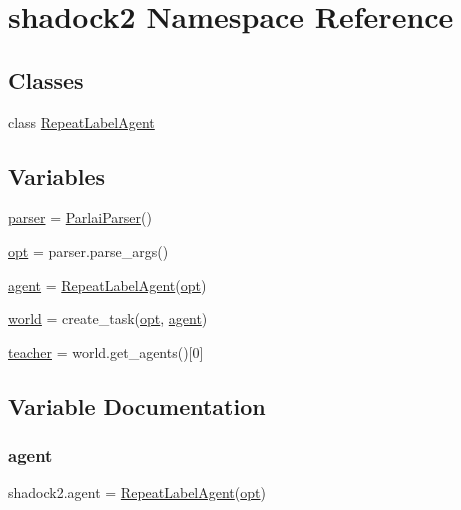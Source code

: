 \hypertarget{namespaceshadock2}{}\section{shadock2 Namespace Reference}
\label{namespaceshadock2}
\subsection*{Classes}
\begin{DoxyCompactItemize}
\item 
class \hyperlink{classshadock2_1_1RepeatLabelAgent}{Repeat\+Label\+Agent}
\end{DoxyCompactItemize}
\subsection*{Variables}
\begin{DoxyCompactItemize}
\item 
\hyperlink{namespaceshadock2_a89dd1b082837e937b1dacacec493a269}{parser} = \hyperlink{classparlai_1_1core_1_1params_1_1ParlaiParser}{Parlai\+Parser}()
\item 
\hyperlink{namespaceshadock2_ac16afc5d0983dc9d7e5608d98ef9c8cd}{opt} = parser.\+parse\+\_\+args()
\item 
\hyperlink{namespaceshadock2_a143910b54855edb0a70ffc547d2eb8d7}{agent} = \hyperlink{classshadock2_1_1RepeatLabelAgent}{Repeat\+Label\+Agent}(\hyperlink{namespaceshadock2_ac16afc5d0983dc9d7e5608d98ef9c8cd}{opt})
\item 
\hyperlink{namespaceshadock2_a3165bdff07a55337c2686e7c56b394e4}{world} = create\+\_\+task(\hyperlink{namespaceshadock2_ac16afc5d0983dc9d7e5608d98ef9c8cd}{opt}, \hyperlink{namespaceshadock2_a143910b54855edb0a70ffc547d2eb8d7}{agent})
\item 
\hyperlink{namespaceshadock2_a8f51abf464ce9479012a1e3b3a64668e}{teacher} = world.\+get\+\_\+agents()\mbox{[}0\mbox{]}
\end{DoxyCompactItemize}


\subsection{Variable Documentation}
\mbox{\label{namespaceshadock2_a143910b54855edb0a70ffc547d2eb8d7}} 
\subsubsection{\texorpdfstring{agent}{agent}}
{\footnotesize\ttfamily shadock2.\+agent = \hyperlink{classshadock2_1_1RepeatLabelAgent}{Repeat\+Label\+Agent}(\hyperlink{namespaceshadock2_ac16afc5d0983dc9d7e5608d98ef9c8cd}{opt})}



